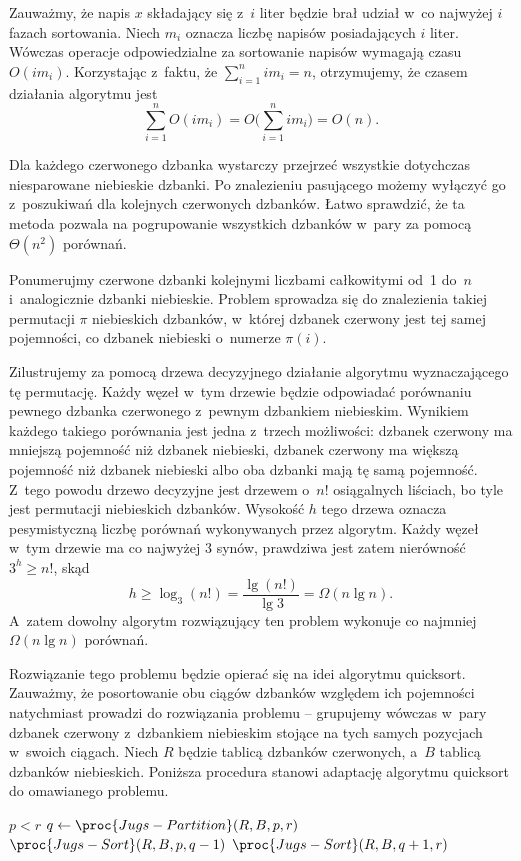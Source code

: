 Zauważmy, że napis $x$ składający się z~$i$ liter będzie brał udział w~co najwyżej $i$ fazach sortowania. Niech $m_i$ oznacza liczbę napisów posiadających $i$ liter. Wówczas operacje odpowiedzialne za sortowanie napisów  wymagają czasu $O(im_i)$. Korzystając z~faktu, że $\sum_{i=1}^nim_i=n$, otrzymujemy, że czasem działania algorytmu jest
\[
    \sum_{i=1}^nO(im_i) = O\biggl(\sum_{i=1}^nim_i\biggr) = O(n).
\]


\subproblem %
Dla każdego czerwonego dzbanka wystarczy przejrzeć wszystkie dotychczas niesparowane niebieskie dzbanki. Po znalezieniu pasującego możemy wyłączyć go z~poszukiwań dla kolejnych czerwonych dzbanków. Łatwo sprawdzić, że ta metoda pozwala na pogrupowanie wszystkich dzbanków w~pary za pomocą $\Theta(n^2)$ porównań.

\subproblem %
Ponumerujmy czerwone dzbanki kolejnymi liczbami całkowitymi od~1 do~$n$ i~analogicznie dzbanki niebieskie. Problem sprowadza się do znalezienia takiej permutacji $\pi$ niebieskich dzbanków, w~której  dzbanek czerwony jest tej samej pojemności, co dzbanek niebieski o~numerze $\pi(i)$.

Zilustrujemy za pomocą drzewa decyzyjnego działanie algorytmu wyznaczającego tę permutację. Każdy węzeł w~tym drzewie będzie odpowiadać porównaniu pewnego dzbanka czerwonego z~pewnym dzbankiem niebieskim. Wynikiem każdego takiego porównania jest jedna z~trzech możliwości: dzbanek czerwony ma mniejszą pojemność niż dzbanek niebieski, dzbanek czerwony ma większą pojemność niż dzbanek niebieski albo oba dzbanki mają tę samą pojemność. Z~tego powodu drzewo decyzyjne jest drzewem  o~$n!$ osiągalnych liściach, bo tyle jest permutacji niebieskich dzbanków. Wysokość $h$ tego drzewa oznacza pesymistyczną liczbę porównań wykonywanych przez algorytm. Każdy węzeł w~tym drzewie ma co najwyżej 3 synów, prawdziwa jest zatem nierówność $3^h\ge n!$, skąd
\[
	h \ge \log_3(n!) = \frac{\lg(n!)}{\lg3} = \Omega(n\lg n).
\]
A~zatem dowolny algorytm rozwiązujący ten problem wykonuje co najmniej $\Omega(n\lg n)$ porównań.

\subproblem %
Rozwiązanie tego problemu będzie opierać się na idei algorytmu quicksort. Zauważmy, że posortowanie obu ciągów dzbanków względem ich pojemności natychmiast prowadzi do rozwiązania problemu -- grupujemy wówczas w~pary dzbanek czerwony z~dzbankiem niebieskim stojące na tych samych pozycjach w~swoich ciągach. Niech $R$ będzie tablicą dzbanków czerwonych, a~$B$ tablicą dzbanków niebieskich. Poniższa procedura stanowi adaptację algorytmu quicksort do omawianego problemu.
\begin{codebox}
\li	\If $p<r$
\li		\Then
			$q\gets\proc{Jugs-Partition}(R,B,p,r)$
\li			$\proc{Jugs-Sort}(R,B,p,q-1)$
\li			$\proc{Jugs-Sort}(R,B,q+1,r)$
		\End
\end{codebox}

